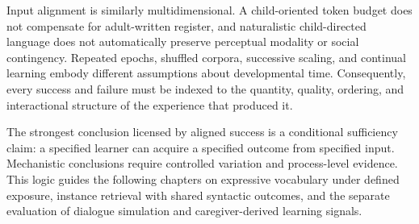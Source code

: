 Input alignment is similarly multidimensional. A child-oriented token budget does not compensate for adult-written register, and naturalistic child-directed language does not automatically preserve perceptual modality or social contingency. Repeated epochs, shuffled corpora, successive scaling, and continual learning embody different assumptions about developmental time. Consequently, every success and failure must be indexed to the quantity, quality, ordering, and interactional structure of the experience that produced it.

The strongest conclusion licensed by aligned success is a conditional sufficiency claim: a specified learner can acquire a specified outcome from specified input. Mechanistic conclusions require controlled variation and process-level evidence. This logic guides the following chapters on expressive vocabulary under defined exposure, instance retrieval with shared syntactic outcomes, and the separate evaluation of dialogue simulation and caregiver-derived learning signals.

